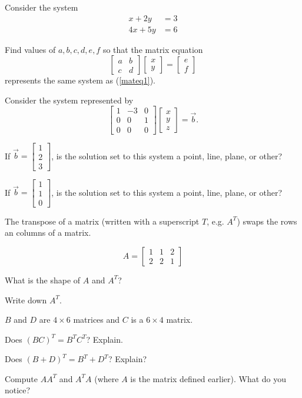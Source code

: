 \documentclass[letter]{article}
\newcommand{\mat}[1]{\begin{bmatrix}#1\end{bmatrix}}
\begin{document}
	Consider the system
	\begin{equation}\label{mateq1}
		\begin{array}{ll}
			x+2y &= 3\\
			4x+5y &= 6
		\end{array}
	\end{equation}

	\begin{Enum}
		\item Find values of $a,b,c,d,e,f$ so that the matrix equation
		\[
			\mat{a&b\\c&d}\mat{x\\y}=\mat{e\\f}
		\]
		represents the same system as (\ref{mateq1}).
	\end{Enum}

	Consider the system represented by
	\[
		\mat{1&-3&0\\0&0&1\\0&0&0}\mat{x\\y\\z}=\vec b.
	\]
	\begin{Enum}[resume]
		\item If $\vec b=\mat{1\\2\\3}$, is the solution set to this system a 
		point, line, plane, or other?
		\item If $\vec b=\mat{1\\1\\0}$, is the solution set to this system a 
		point, line, plane, or other?
	\end{Enum}

	The transpose of a matrix (written with a superscript $T$, e.g. $A^T$) swaps
	the rows an columns of a matrix.

	\[
		A=\mat{1&1&2\\2&2&1}
	\]
	\begin{Enum}
		\item What is the shape of $A$ and $A^T$?
		\item Write down $A^T$.
	\end{Enum}

	$B$ and $D$ are $4\times 6$ matrices and $C$ is a $6\times 4$ matrix.

	\begin{Enum}[resume]
		\item Does $(BC)^T=B^TC^T$? Explain.
		\item Does $(B+D)^T=B^T+D^T$? Explain?
		\item Compute $AA^T$ and $A^TA$ (where $A$ is the matrix defined earlier).
		What do you notice?
	\end{Enum}
\end{document}
